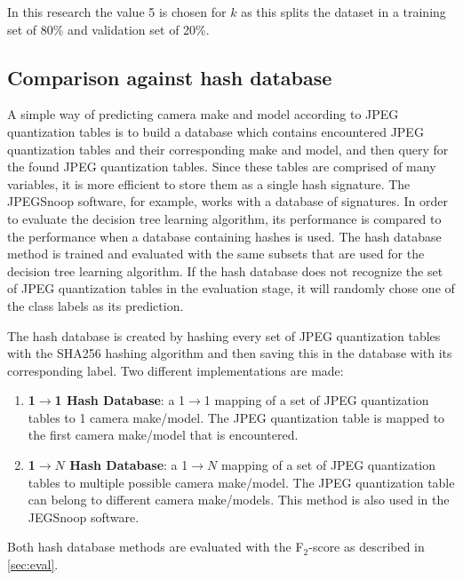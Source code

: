 In this research the value 5 is chosen for $k$ as this splits the dataset in a training set of 80\% and validation set of 20\%.

\subsection{Comparison against hash database}\label{sec:impl_hash}
A simple way of predicting camera make and model according to JPEG quantization tables is to build a database which contains encountered JPEG quantization tables and their corresponding make and model, and then query for the found JPEG quantization tables. Since these tables are comprised of many variables, it is more efficient to store them as a single hash signature. The JPEGSnoop software, for example, works with a database of signatures. In order to evaluate the decision tree learning algorithm, its performance is compared to the performance when a database containing hashes is used. The hash database method is trained and evaluated with the same subsets that are used for the decision tree learning algorithm. If the hash database does not recognize the set of JPEG quantization tables in the evaluation stage, it will randomly chose one of the class labels as its prediction. 

The hash database is created by hashing every set of JPEG quantization tables with the SHA256 hashing algorithm and then saving this in the database with its corresponding label. Two different implementations are made:
\begin{enumerate}
\item \textbf{1$\rightarrow$1 Hash Database}: a 1$\rightarrow$1 mapping of a set of JPEG quantization tables to 1 camera make/model. The JPEG quantization table is mapped to the first camera make/model that is encountered.
\item \textbf{1$\rightarrow N$ Hash Database}: a 1$\rightarrow N$ mapping of a set of JPEG quantization tables to multiple possible camera make/model. The JPEG quantization table can belong to different camera make/models. This method is also used in the JEGSnoop software. 
\end{enumerate}

Both hash database methods are evaluated with the F$_2$-score as described in \autoref{sec:eval}.